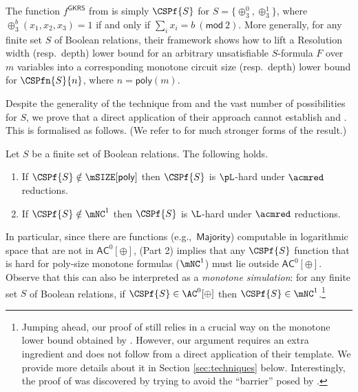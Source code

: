 \documentclass[11pt]{article}
\begin{document}
The function $f^{\mathsf{GKRS}}$ from \citep{gkrs19} is simply $\CSPf{S}$ for $S = \{\oplus^0_3, \oplus^1_3\}$, where $\oplus^b_3(x_1,x_2,x_3) = 1$ if and only if $\sum_i x_i = b~(\mathsf{mod}~2)$. More generally, for any finite set $S$ of Boolean relations, their framework shows how to lift a Resolution width (resp.~depth) lower bound for an arbitrary unsatisfiable $S$-formula $F$ over $m$ variables into a corresponding monotone circuit size (resp.~depth) lower bound for $\CSPfn{S}{n}$, where $n = \mathsf{poly}(m)$. 

Despite the generality of the technique from \citep{gkrs19} and the vast number of possibilities for $S$, we prove that a direct application of their approach cannot establish  and . This is formalised as follows. (We refer to  for much stronger forms of the result.)


\begin{theorem}
    \label{thm:cspsat-intro}
    Let $S$ be a finite set of Boolean relations. The following holds. 
    \begin{enumerate}
        \item    If 
            $\CSPf{S} \notin \mSIZE[\mathsf{poly}]$
            then
            $\CSPf{S}$ is 
             $\pL$-hard under
            $\acmred$ reductions.
        \item  
            If
            $\CSPf{S} \notin \mNC^1$
            then $\CSPf{S}$ is $\L$-hard under
            $\acmred$ reductions.
    \end{enumerate}
\end{theorem}

In particular, since there are functions (e.g.,~$\mathsf{Majority}$) computable in logarithmic space that are not in $\mathsf{AC}^0[\oplus]$,  (Part 2) implies that any  $\CSPf{S}$ function that is hard for poly-size monotone formulas ($\mNC^1$) must lie outside $\mathsf{AC}^0[\oplus]$. Observe that this can also be interpreted as a \emph{monotone simulation}: for any finite set $S$ of Boolean relations, if $\CSPf{S} \in \AC^0[\oplus]$ then $\CSPf{S} \in \mNC^1$.\footnote{
Jumping ahead, our proof of  still relies in a crucial way on the monotone lower bound obtained by \citep{gkrs19}. However, our argument requires an extra ingredient and does not follow from a direct application of their template. We provide more details about it in Section \ref{sec:techniques} below. Interestingly, the proof of  was discovered by trying to avoid the ``barrier'' posed by .}
\end{document}
